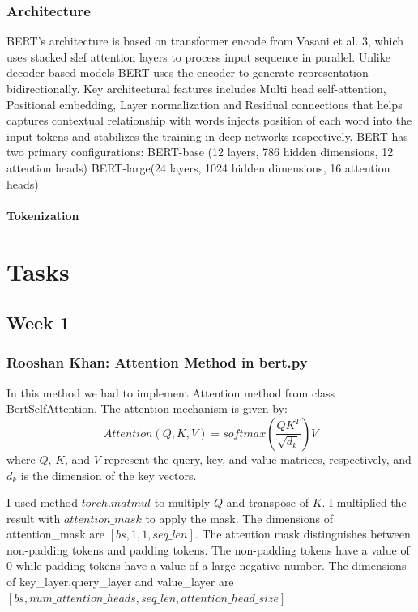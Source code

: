 \documentclass{article}
\begin{document}
\subsubsection{Architecture}
BERT's architecture is based on transformer encode from Vasani et al. 3, which uses stacked slef
attention layers to process input sequence in parallel. Unlike decoder based models BERT uses the 
encoder to generate representation bidirectionally. Key architectural features includes Multi head 
self-attention, Positional embedding, Layer normalization and Residual connections that helps 
captures contextual relationship with words injects position of each word into the input tokens and 
stabilizes the training in deep networks respectively. BERT has two primary configurations:
 BERT-base (12 layers, 786 hidden dimensions, 12 attention heads)
 BERT-large(24 layers, 1024 hidden dimensions, 16 attention heads)
\paragraph{Tokenization}
\section{Tasks}
\subsection{Week 1}
\subsubsection{Rooshan Khan: Attention Method in bert.py}
In this method we had to implement Attention method from class BertSelfAttention. The attention mechanism is given by:
\begin{equation} \label{eqn4}
Attention(Q,K,V) = {softmax(\frac{QK^T}{\sqrt{d_k}})V}
\end{equation}
where \( Q \), \( K \), and \( V \) represent the query, key, and value matrices, respectively, and \( d_k \) is the dimension of the key vectors.

I used method \( torch.matmul \) to multiply \( Q \) and transpose of \( K \). I multiplied the result with \( attention\_mask \) to apply the mask. The dimensions of attention\_mask are \( [bs, 1, 1, seq\_len] \). The attention mask distinguishes between non-padding tokens and padding tokens. The non-padding tokens have a value of 0 while padding tokens have a value of a large negative number. The dimensions of key\_layer,query\_layer and value\_layer are \( [bs, num\_attention\_heads, seq\_len, attention\_head\_size] \)
\end{document}
